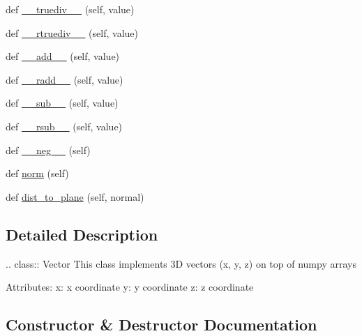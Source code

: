 \begin{DoxyCompactItemize}
\item 
def \hyperlink{classsrc_1_1vector_1_1Vector_ad8a51ed8ec4efbec47db53f9cbc4f33c}{\+\_\+\+\_\+truediv\+\_\+\+\_\+} (self, value)
\item 
def \hyperlink{classsrc_1_1vector_1_1Vector_ae3f710761f166c6d71eb1be1ae09f851}{\+\_\+\+\_\+rtruediv\+\_\+\+\_\+} (self, value)
\item 
def \hyperlink{classsrc_1_1vector_1_1Vector_a358bc9e03ceee15962541fd1f21685c1}{\+\_\+\+\_\+add\+\_\+\+\_\+} (self, value)
\item 
def \hyperlink{classsrc_1_1vector_1_1Vector_aa415d64bea7eafc994e769a9fe9a02c3}{\+\_\+\+\_\+radd\+\_\+\+\_\+} (self, value)
\item 
def \hyperlink{classsrc_1_1vector_1_1Vector_a842a13149bd1e22adc486daab3b08cdc}{\+\_\+\+\_\+sub\+\_\+\+\_\+} (self, value)
\item 
def \hyperlink{classsrc_1_1vector_1_1Vector_a4fbad206cb9308d4af2a86f3c61e5b3c}{\+\_\+\+\_\+rsub\+\_\+\+\_\+} (self, value)
\item 
def \hyperlink{classsrc_1_1vector_1_1Vector_ae76dbcd24a651b636ce5a685273f0c97}{\+\_\+\+\_\+neg\+\_\+\+\_\+} (self)
\item 
def \hyperlink{classsrc_1_1vector_1_1Vector_a989ee5f9062c515ed2d2cfab3229c903}{norm} (self)
\item 
def \hyperlink{classsrc_1_1vector_1_1Vector_af038a360252680d587ea272804bbee80}{dist\+\_\+to\+\_\+plane} (self, normal)
\end{DoxyCompactItemize}


\subsection{Detailed Description}
\begin{DoxyVerb}.. class:: Vector
This class implements 3D vectors (x, y, z) on top of numpy arrays

Attributes:
    x: x coordinate
    y: y coordinate
    z: z coordinate
\end{DoxyVerb}
 

\subsection{Constructor \& Destructor Documentation}
\mbox{\label{classsrc_1_1vector_1_1Vector_a2f63fb5ba898c0934b16c7fcc3f810b9}} 
